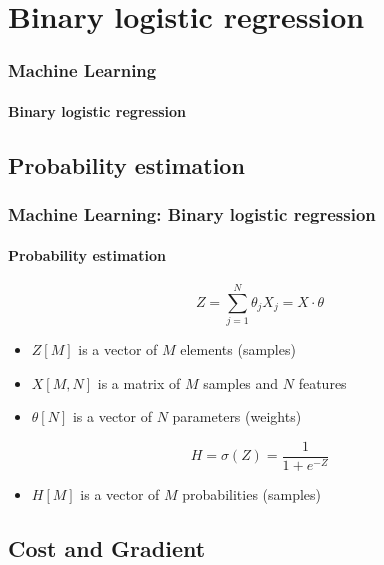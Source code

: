 \documentclass[xcolor=table]{beamer}
\begin{document}
\section{Binary logistic regression}

\begin{frame}
	\frametitle{Machine Learning}
	\framesubtitle{Binary logistic regression}
	
	\begin{center}
	\end{center}
	
\end{frame}

\subsection{Probability estimation}

\begin{frame}
\frametitle{Machine Learning: Binary logistic regression}
\framesubtitle{Probability estimation}

\[Z = \sum_{j=1}^{N} \theta_j X_j = X \cdot \theta\]
\begin{itemize}
	\item $Z[M]$ is a vector of $M$ elements (samples)
	\item $X[M, N]$ is a matrix of $M$ samples and $N$ features
	\item $\theta[N]$ is a vector of $N$ parameters (weights)
\end{itemize}

\[H = \sigma(Z) = \frac{1}{1+e^{-Z}}\]

\begin{itemize}
	\item $H[M]$ is a vector of $M$ probabilities (samples)
\end{itemize}

\end{frame}

\subsection{Cost and Gradient}
\end{document}

